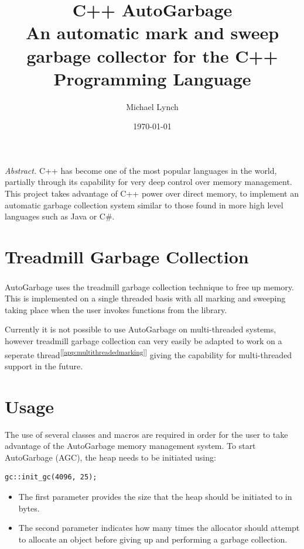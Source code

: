 \documentclass[11pt]{article}
\title{C++ AutoGarbage\\\medskip
\large An automatic mark and sweep garbage collector for the C++ Programming Language}
\author{Michael Lynch}
\date{\today}
\begin{document}
\begin{titlingpage}
\maketitle
\end{titlingpage}
\newpage

\vspace*{0.15\textheight}
\emph{Abstract.} C++ has become one of the most popular languages in the world, partially through its capability for
very deep control over memory management.
This project takes advantage of C++ power over direct memory, to implement an automatic garbage collection system
similar to those found in more high level languages such as Java or C\#.

\newpage
\tableofcontents
\newpage
\section{Treadmill Garbage Collection}
AutoGarbage uses the treadmill garbage collection technique\textsuperscript{\cite{bib:treadmillgc}} to
free up memory. This is implemented
on a single threaded basis with all marking and sweeping taking place when the user invokes functions from
the library.

Currently it is not possible to use AutoGarbage on multi-threaded systems, however treadmill garbage collection
can very easily be adapted to work on a seperate thread\textsuperscript{[\ref{app:multithreadedmarking}]}
giving the capability for multi-threaded support in the future.
\section{Usage}
The use of several classes and macros are required in order for the user to take advantage of the AutoGarbage memory 
management system. To start AutoGarbage (AGC), the heap needs to be initiated using:
\begin{lstlisting}
gc::init_gc(4096, 25);
\end{lstlisting}
\begin{itemize}
\item The first parameter provides the size that the heap should be initiated to in bytes.
\item The second parameter indicates how many times the allocator should attempt to allocate an object before giving
up and performing a garbage collection.
\end{itemize}
\end{document}

